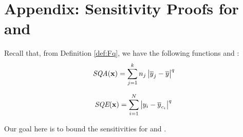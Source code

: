 
\section{Appendix: Sensitivity Proofs for \sqa and \sqe}\label{sec:fqsensitivity}

Recall that, from Definition \ref{def:Fq}, we have the following functions \sqa and \sqe:
\begin{equation*}
\textit{SQA}(\mathbf{x}) = \sum_{j=1}^k n_j \left\vert \overline{y}_j - \overline{y} \right\vert^q
\end{equation*}

\begin{equation*}
\textit{SQE}(\mathbf{x}) = \sum_{i=1}^N \left\vert y_i - \overline{y}_{c_i} \right\vert^q
\end{equation*}

\noindent Our goal here is to bound the sensitivities for \sqa and \sqe.

